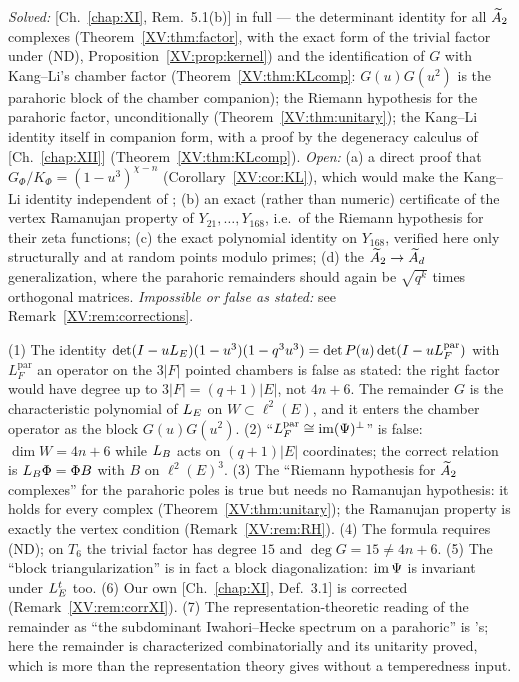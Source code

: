 \begin{remark}\label{XV:rem:scope}
\begin{sloppypar}
\emph{Solved:} [Ch.~\ref{chap:XI}, Rem.~5.1(b)] in full --- the determinant identity for all $\widetilde A_2$ complexes
(Theorem~\ref{XV:thm:factor}, with the exact form of the trivial factor under (ND),
Proposition~\ref{XV:prop:kernel}) and the identification of $G$ with Kang--Li's chamber factor
(Theorem~\ref{XV:thm:KLcomp}: $G(u)G(u^{2})$ is the parahoric block of the chamber companion);
the Riemann hypothesis for the parahoric factor, unconditionally (Theorem~\ref{XV:thm:unitary});
the Kang--Li identity itself in companion form, with a proof by the degeneracy calculus of
[Ch.~\ref{chap:XII}] (Theorem~\ref{XV:thm:KLcomp}). \emph{Open:} (a) a direct proof that $G_\Phi/K_\Phi=
(1-u^{3})^{\chi-n}$ (Corollary~\ref{XV:cor:KL}), which would make the Kang--Li identity
independent of \cite{KL}; (b) an exact (rather than numeric) certificate of the vertex
Ramanujan property of $Y_{21},\dots,Y_{168}$, i.e.\ of the Riemann hypothesis for their zeta
functions; (c) the exact polynomial identity on $Y_{168}$, verified here only structurally
and at random points modulo primes; (d) the $\widetilde A_2\to\widetilde A_d$ generalization, where
the parahoric remainders should again be $\sqrt{q^{k}}$ times orthogonal matrices.
\emph{Impossible or false as stated:} see Remark~\ref{XV:rem:corrections}.
\end{sloppypar}
\end{remark}

\begin{remark}\label{XV:rem:corrections}
\begin{sloppypar}
(1) The identity $\det(I-uL_E)(1-u^{3})(1-q^{3}u^{3})=\det P(u)\det(I-uL_F^{\mathrm{par}})$ with
$L_F^{\mathrm{par}}$ an operator on the $3|F|$ pointed chambers is false as stated: the right
factor would have degree up to $3|F|=(q{+}1)|E|$, not $4n+6$. The remainder $G$ is the
characteristic polynomial of $L_E$ on $W\subset\ell^{2}(E)$, and it enters the chamber
operator as the block $G(u)G(u^{2})$. (2) ``$L_F^{\mathrm{par}}\cong\operatorname{im}(\Psi)^{\perp}$'' is
false: $\dim W=4n+6$ while $L_B$ acts on $(q{+}1)|E|$ coordinates; the correct relation is
$L_B\Phi=\Phi B$ with $B$ on $\ell^{2}(E)^{3}$. (3) The ``Riemann hypothesis for $\widetilde A_2$
complexes'' for the parahoric poles is true but needs no Ramanujan hypothesis: it holds for
every complex (Theorem~\ref{XV:thm:unitary}); the Ramanujan property is exactly the vertex
condition (Remark~\ref{XV:rem:RH}). (4) The formula requires (ND); on $T_6$ the trivial factor
has degree $15$ and $\deg G=15\ne4n+6$. (5) The ``block triangularization'' is in fact a
block diagonalization: $\operatorname{im}\Psi$ is invariant under $L_E^{t}$ too. (6) Our own [Ch.~\ref{chap:XI}, Def.~3.1] is corrected (Remark~\ref{XV:rem:corrXI}). (7) The representation-theoretic reading of
the remainder as ``the subdominant Iwahori--Hecke spectrum on a parahoric'' is \cite{KLW}'s;
here the remainder is characterized combinatorially and its unitarity proved, which is more
than the representation theory gives without a temperedness input.
\end{sloppypar}
\end{remark}

